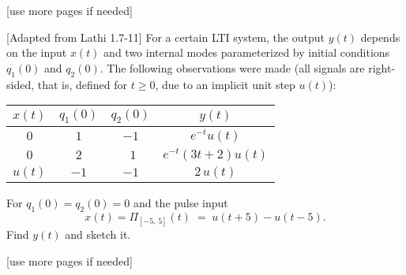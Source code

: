\documentclass{ee102_pset}
\begin{document}
\vspace*{\fill}
\begin{center}
[use more pages if needed]
\end{center}
[Adapted from Lathi 1.7-11]
For a certain LTI system, the output $y(t)$ depends on the input $x(t)$ and two internal modes parameterized by initial conditions $q_1(0)$ and $q_2(0)$. The following observations were made (all signals are right-sided, that is, defined for $t\geq 0$, due to an implicit unit step $u(t)$):

\begin{center}
\begin{tabular}{c c c c}
\hline
$x(t)$ & $q_1(0)$ & $q_2(0)$ & $y(t)$ \\
\hline
$0$ & $1$ & $-1$ & $e^{-t}u(t)$ \\
$0$ & $2$ & $\ \,1$ & $e^{-t}(3t+2)u(t)$ \\
$u(t)$ & $-1$ & $-1$ & $2\,u(t)$ \\
\hline
\end{tabular}
\end{center}

For $q_1(0)=q_2(0)=0$ and the pulse input
\[
x(t)=\Pi_{[-5,\,5]}(t)\;=\;u(t+5)-u(t-5).
\]
Find $y(t)$ and sketch it.

\vspace*{\fill}
\begin{center}
[use more pages if needed]
\end{center}
\end{document}
